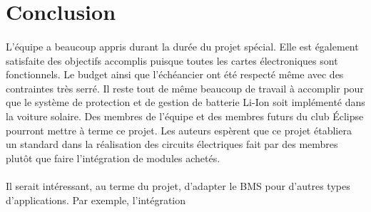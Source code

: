 \section{Conclusion}

	\paragraph{}
	L'équipe a beaucoup appris durant la durée du projet spécial. Elle est également satisfaite des objectifs accomplis puisque toutes les cartes électroniques sont fonctionnels. Le budget ainsi que l'échéancier ont été respecté même avec des contraintes très serré. Il reste tout de même beaucoup de travail à accomplir pour que le système de protection et de gestion de batterie Li-Ion soit implémenté dans la voiture solaire. Des membres de l'équipe et des membres futurs du club Éclipse pourront mettre à terme ce projet. Les auteurs espèrent que ce projet établiera un standard dans la réalisation des circuits électriques fait par des membres plutôt que faire l'intégration de modules achetés. 

	\paragraph{}	
	Il serait intéressant, au terme du projet, d'adapter le BMS pour d'autres types d'applications. Par exemple, l'intégration 